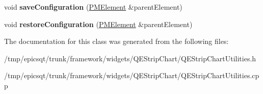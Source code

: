 \begin{DoxyCompactItemize}
\item 
\hypertarget{classValueScaling_ab4bf09a3992776864def409ad152c9b5}{
void {\bfseries saveConfiguration} (\hyperlink{classPMElement}{PMElement} \&parentElement)}
\label{classValueScaling_ab4bf09a3992776864def409ad152c9b5}

\item 
\hypertarget{classValueScaling_a3ee815aa393c1b7eaa2cdc0a3c85df03}{
void {\bfseries restoreConfiguration} (\hyperlink{classPMElement}{PMElement} \&parentElement)}
\label{classValueScaling_a3ee815aa393c1b7eaa2cdc0a3c85df03}

\end{DoxyCompactItemize}


The documentation for this class was generated from the following files:\begin{DoxyCompactItemize}
\item 
/tmp/epicsqt/trunk/framework/widgets/QEStripChart/QEStripChartUtilities.h\item 
/tmp/epicsqt/trunk/framework/widgets/QEStripChart/QEStripChartUtilities.cpp\end{DoxyCompactItemize}

